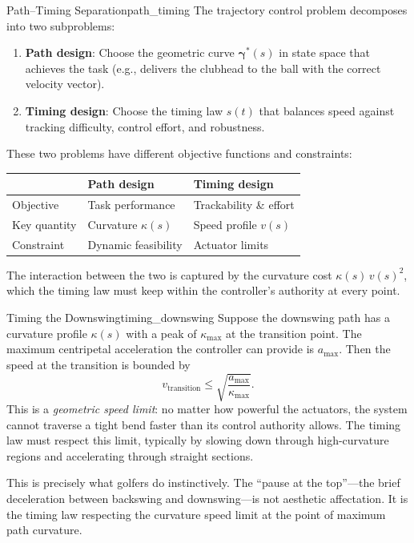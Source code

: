 \documentclass[12pt, openany]{book}
\theoremstyle{plain}
\newcommand{\traj}{\bm{\gamma}}
\begin{document}
\begin{principle}{Path--Timing Separation}{path_timing}
  The trajectory control problem decomposes into two subproblems:
  \begin{enumerate}[label=\textbf{(\Alph*)}]
    \item \textbf{Path design}: Choose the geometric curve $\traj^*(s)$ in state
      space that achieves the task (e.g., delivers the clubhead to the ball with
      the correct velocity vector).
    \item \textbf{Timing design}: Choose the timing law $s(t)$ that balances
      speed against tracking difficulty, control effort, and robustness.
  \end{enumerate}
  These two problems have different objective functions and constraints:
  \begin{center}
  \renewcommand{\arraystretch}{1.3}
  \begin{tabular}{@{} l l l @{}}
    \toprule
    & \textbf{Path design} & \textbf{Timing design} \\
    \midrule
    Objective & Task performance & Trackability \& effort \\
    Key quantity & Curvature $\kappa(s)$ & Speed profile $v(s)$ \\
    Constraint & Dynamic feasibility & Actuator limits \\
    \bottomrule
  \end{tabular}
  \end{center}
  The interaction between the two is captured by the curvature cost
  $\kappa(s)\, v(s)^2$, which the timing law must keep within the controller's
  authority at every point.
\end{principle}

\begin{example}{Timing the Downswing}{timing_downswing}
  Suppose the downswing path has a curvature profile $\kappa(s)$ with a peak
  of $\kappa_{\max}$ at the transition point. The maximum centripetal
  acceleration the controller can provide is $a_{\max}$. Then the speed at
  the transition is bounded by
  \begin{equation}
    v_{\text{transition}} \leq \sqrt{\frac{a_{\max}}{\kappa_{\max}}}.
  \end{equation}
  This is a \emph{geometric speed limit}: no matter how powerful the actuators,
  the system cannot traverse a tight bend faster than its control authority
  allows. The timing law must respect this limit, typically by slowing down
  through high-curvature regions and accelerating through straight sections.

  This is precisely what golfers do instinctively. The ``pause at the top''---the
  brief deceleration between backswing and downswing---is not aesthetic
  affectation. It is the timing law respecting the curvature speed limit at
  the point of maximum path curvature.
\end{example}
\end{document}

